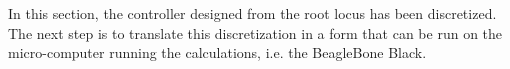 In this section, the controller designed from the root locus has been discretized. The next step is to translate this discretization in a form that can be run on the micro-computer running the calculations, i.e. the BeagleBone Black.

